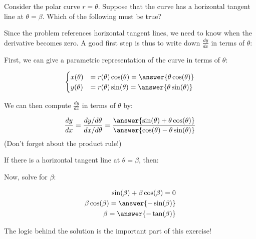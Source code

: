 \documentclass{ximera}
\author{Jim Talamo}
\begin{document}
\begin{exercise}
Consider the polar curve $r = \theta$.  Suppose that the curve has a horizontal tangent line at $\theta = \beta$.  Which of the following must be true?

\begin{multipleChoice}
\choice{$\beta = \cos{\beta}$}
\choice{$\beta = -\cos{\beta}$}
\choice{$\beta = \sin{\beta}$}
\choice{$\beta = -\sin{\beta}$}
\choice{$\beta = \tan{\beta}$}
\choice[correct]{$\beta = -\tan{\beta}$}
\end{multipleChoice}

\begin{hint}
Since the problem references horizontal tangent lines, we need to know when the derivative becomes zero.  A good first step is thus to write down $\frac{dy}{dx}$ in terms of $\theta$:

First, we can give a parametric representation of the curve in terms of $\theta$:

\[
\begin{cases}
x(\theta) &= r(\theta) \cos(\theta) = \answer{\theta \cos(\theta)}\\
y(\theta) &= r(\theta) \sin(\theta) = \answer{\theta \sin(\theta)}
\end{cases}
\]

We can then compute $\frac{dy}{dx}$ in terms of $\theta$ by:

\[
\frac{dy}{dx} = \frac{dy / d\theta}{dx / d\theta} = \frac{ \answer{\sin(\theta) + \theta \cos(\theta)} }{ \answer{\cos(\theta) - \theta \sin(\theta)} }
\]
(Don't forget about the product rule!)

\begin{question}
If there is a horizontal tangent line at $\theta = \beta$, then:

\begin{multipleChoice}
\end{multipleChoice}
\end{question}

Now, solve for $\beta$:

\begin{align*}
\sin(\beta) + \beta \cos(\beta)=0 \\
 \beta \cos(\beta)=\answer{-\sin(\beta)}\\
\beta = \answer{-\tan(\beta)}
\end{align*}
\end{hint}

The logic behind the solution is the important part of this exercise!

\end{exercise}
\end{document}
